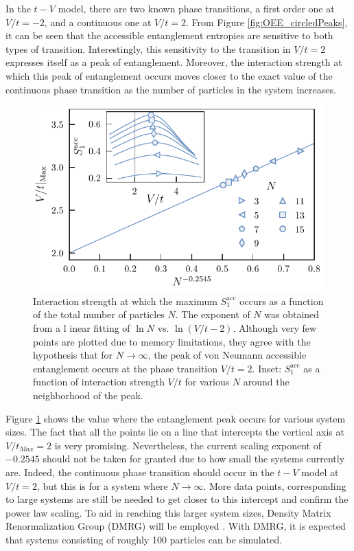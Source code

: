 	In the $t-V$ model, there are two known phase transitions, a first order one at $V/t=-2$, and a continuous one at $V/t=2$. From Figure \ref{fig:OEE_circledPeaks}, it can be seen that the accessible entanglement entropies are sensitive to both types of transition. Interestingly, this sensitivity to the transition in $V/t=2$ expresses itself as a peak of entanglement. Moreover, the interaction strength at which this peak of entanglement occurs moves closer to the exact value of the continuous phase transition as the number of particles in the system increases.  
	
	\begin{figure}[h!]
	\begin{center}
	\includegraphics[scale=1.0]{peakScalingOddN.pdf}
	\end{center}
	\caption{Interaction strength at which the maximum $S_{1}^{\mathrm{acc}}$ occurs as a 	function of the total number of particles $N$. The exponent of $N$ was obtained from a l	inear fitting of $\ln N$ vs. $\ln{(V/t - 2)}$.  Although very few points are plotted due to 	memory limitations, they agree with the hypothesis that for $N \to \infty$, the peak of 	von Neumann accessible entanglement occurs at the phase transition $V/t = 2$. Inset: 	$S_{1}^{\mathrm{acc}}$ as a function of interaction strength $V/t$ for various $N$ 		around the neighborhood of the peak.}
	\label{fig:peakScalingOddN}
	\end{figure}
	
	Figure \ref{fig:peakScalingOddN} shows the value where the entanglement peak occurs for various system sizes. The fact that all the points lie on a line that intercepts the vertical axis at $V/t_{Max}=2$ is very promising. Nevertheless, the current scaling exponent of $-0.2545$ should not be taken for granted due to how small the systems currently are. Indeed, the continuous phase transition should occur in the $t-V$ model at $V/t=2$, but this is for a system where $N \to \infty$. More data points, corresponding to large systems are still be needed to get closer to this intercept and confirm the power law scaling. To aid in reaching this larger system sizes, Density Matrix Renormalization Group (DMRG) will be employed \cite{SCHOLLWOCK201196, itensor}. With DMRG, it is expected that systems consisting of roughly 100 particles can be simulated.

